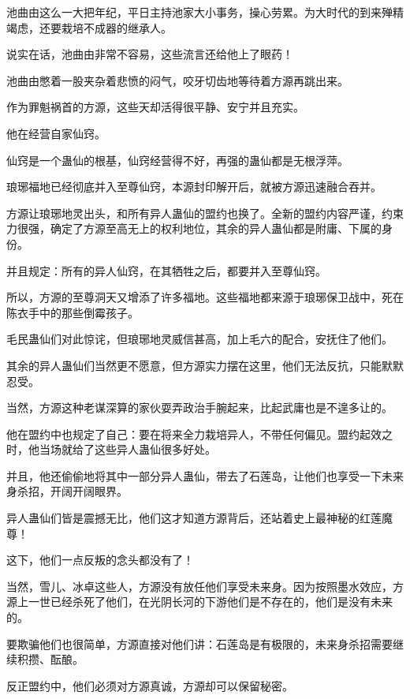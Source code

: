 
\begin{this_body}



池曲由这么一大把年纪，平日主持池家大小事务，操心劳累。为大时代的到来殚精竭虑，还要栽培不成器的继承人。

说实在话，池曲由非常不容易，这些流言还给他上了眼药！

池曲由憋着一股夹杂着悲愤的闷气，咬牙切齿地等待着方源再跳出来。

作为罪魁祸首的方源，这些天却活得很平静、安宁并且充实。

他在经营自家仙窍。

仙窍是一个蛊仙的根基，仙窍经营得不好，再强的蛊仙都是无根浮萍。

琅琊福地已经彻底并入至尊仙窍，本源封印解开后，就被方源迅速融合吞并。

方源让琅琊地灵出头，和所有异人蛊仙的盟约也换了。全新的盟约内容严谨，约束力很强，确定了方源至高无上的权利地位，其余的异人蛊仙都是附庸、下属的身份。

并且规定：所有的异人仙窍，在其牺牲之后，都要并入至尊仙窍。

所以，方源的至尊洞天又增添了许多福地。这些福地都来源于琅琊保卫战中，死在陈衣手中的那些倒霉孩子。

毛民蛊仙们对此惊诧，但琅琊地灵威信甚高，加上毛六的配合，安抚住了他们。

其余的异人蛊仙们当然更不愿意，但方源实力摆在这里，他们无法反抗，只能默默忍受。

当然，方源这种老谋深算的家伙耍弄政治手腕起来，比起武庸也是不遑多让的。

他在盟约中也规定了自己：要在将来全力栽培异人，不带任何偏见。盟约起效之时，他当场就给了这些异人蛊仙很多好处。

并且，他还偷偷地将其中一部分异人蛊仙，带去了石莲岛，让他们也享受一下未来身杀招，开阔开阔眼界。

异人蛊仙们皆是震撼无比，他们这才知道方源背后，还站着史上最神秘的红莲魔尊！

这下，他们一点反叛的念头都没有了！

当然，雪儿、冰卓这些人，方源没有放任他们享受未来身。因为按照墨水效应，方源上一世已经杀死了他们，在光阴长河的下游他们是不存在的，他们是没有未来的。

要欺骗他们也很简单，方源直接对他们讲：石莲岛是有极限的，未来身杀招需要继续积攒、酝酿。

反正盟约中，他们必须对方源真诚，方源却可以保留秘密。


\end{this_body}
